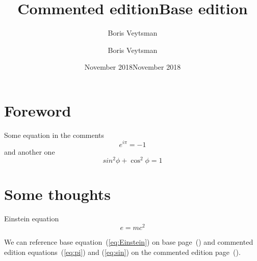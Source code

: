\documentclass{book}
\title{Commented edition}
\author{Boris Veytsman}
\date{November 2018}
\begin{document}
\frontmatter
\title{Base edition}
\author{Boris Veytsman}
\date{November 2018}
\maketitle

\chapter{Foreword}
\label{chap:foreword}


\kant[1-5]

\begin{commeditText}
  \kant[11-17]

  Some equation in the comments
  \begin{equation}
    \label{eq:pi}
    e^{i\pi}=-1
  \end{equation}
  and another one
  \begin{equation}
    \label{eq:sin}
    sin^2\phi+\cos^2\phi=1
  \end{equation}

\end{commeditText}

\mainmatter

\chapter{Some thoughts}
\label{chap:thoughts}



\begin{commeditComments}
  \kant[6]
\end{commeditComments}


Einstein equation
\begin{equation}
  \label{eq:Einstein}
  e=mc^2
\end{equation}

\kant[6]


\begin{commeditComments}
  \kant[2]

  We can reference base equation~(\ref{eq:Einstein}) on base
  page~(\pageref{eq:Einstein}) and commented edition
  equations~(\ref{eq:pi}) and (\ref{eq:sin}) on the commented edition
  page~(\pageref{eq:pi}).

  \kant[7]
\end{commeditComments}

\kant[5-8]

\begin{commeditComments}
  \kant[4]
\end{commeditComments}
\begin{commeditComments}
  \kant[8-20]
\end{commeditComments}

\kant[9-20]
\end{document}
